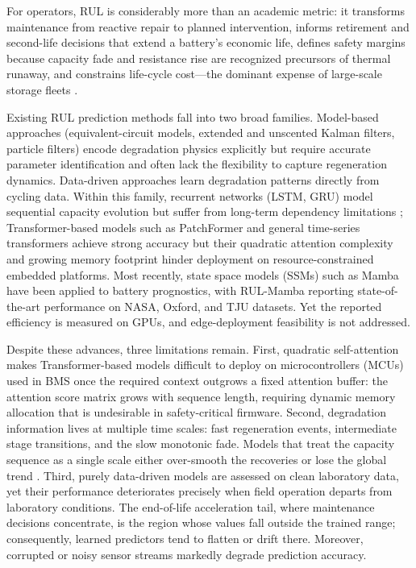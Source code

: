 \documentclass[final,5p,times,twocolumn]{elsarticle}
\begin{document}
For operators, RUL is considerably more than an academic metric: 
it transforms maintenance from reactive repair to planned intervention, 
informs retirement and second-life decisions that extend a battery's economic life, 
defines safety margins because capacity fade and resistance rise are recognized precursors of thermal runaway, 
and constrains life-cycle cost---the dominant expense of large-scale storage fleets
\cite{ref_yang_review,ref_qu_bess}.

Existing RUL prediction methods fall into two broad families.
Model-based approaches (equivalent-circuit models, extended and unscented
Kalman filters, particle filters) encode degradation physics explicitly
\cite{ref_ekf_yan,ref_pf_echem,
ref_pf_rbf,ref_pf_lui} but require accurate parameter identification
and often lack the flexibility to capture regeneration dynamics.
Data-driven approaches learn degradation patterns directly from
cycling data. Within this family, recurrent networks (LSTM, GRU)
\cite{ref_lstm_transformer,ref_lstm_rul_zhang} model
sequential capacity evolution but suffer from long-term dependency
limitations \cite{ref_rulmamba}; Transformer-based models
\cite{ref_vaswani} such as PatchFormer \cite{ref_patchformer}
and general time-series transformers \cite{ref_autoformer}
\cite{ref_fedformer} achieve strong accuracy but their quadratic
attention complexity and growing memory footprint hinder deployment
on resource-constrained embedded platforms. Most recently, state
space models (SSMs) such as Mamba \cite{ref_mamba} have been applied
to battery prognostics, with RUL-Mamba \cite{ref_rulmamba} reporting
state-of-the-art performance on NASA, Oxford, and TJU datasets. Yet
the reported efficiency is measured on GPUs, and edge-deployment
feasibility is not addressed.

Despite these advances, three limitations remain. First, quadratic
self-attention makes Transformer-based models difficult to deploy on
microcontrollers (MCUs) used in BMS once the required context
outgrows a fixed attention buffer: the attention score matrix grows
with sequence length, requiring dynamic memory allocation that is
undesirable in safety-critical firmware. Second, degradation
information lives at multiple time scales: fast regeneration
events, intermediate stage transitions, and the slow monotonic
fade. Models that treat the capacity sequence as a single scale
either over-smooth the recoveries or lose the global trend
\cite{ref_omnitie}. Third, purely data-driven models are assessed on clean laboratory data, 
yet their performance deteriorates precisely when field operation departs from laboratory conditions. 
The end-of-life acceleration tail, where maintenance decisions concentrate, 
is the region whose values fall outside the trained range; consequently, 
learned predictors tend to flatten or drift there. Moreover, 
corrupted or noisy sensor streams markedly degrade prediction accuracy.
\end{document}
